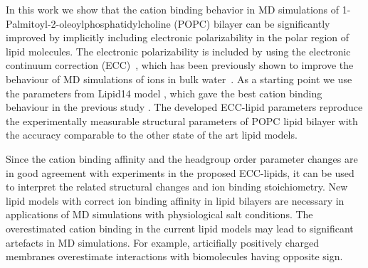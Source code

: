 \documentclass[aip,jcp,twocolumn]{revtex4}
\begin{document}


In this work we show that the cation binding behavior
in MD simulations of 1-Palmitoyl-2-oleoylphosphatidylcholine (POPC) bilayer can be significantly 
improved by implicitly including electronic polarizability
in the polar region of lipid molecules. The electronic
polarizability is included by using the electronic
continuum correction (ECC)~\cite{leontyev11}, which
has been previously shown to improve the behaviour of
MD simulations of ions in bulk water~\cite{Jungwirth2017,Jungwirth2015,kohagen14,kohagen16}. 
As a starting point we use the parameters from Lipid14 model \cite{dickson14},
which gave the best cation binding behaviour in the previous study \cite{catte16}.
The developed ECC-lipid parameters reproduce the experimentally
measurable structural parameters of POPC lipid bilayer with the 
accuracy comparable to the other state of the art lipid models.


Since the cation binding affinity and the headgroup 
order parameter changes are in good agreement with experiments
in the proposed ECC-lipids, it can be used to interpret the
related structural changes and ion binding stoichiometry.
New lipid models with correct ion binding affinity in lipid
bilayers are necessary in applications of 
MD simulations with physiological salt conditions. 
The overestimated cation binding in the current lipid models \cite{catte16}
may lead to significant artefacts in MD simulations. For example,
articifially positively charged membranes overestimate interactions
with biomolecules having opposite sign.
\end{document}
